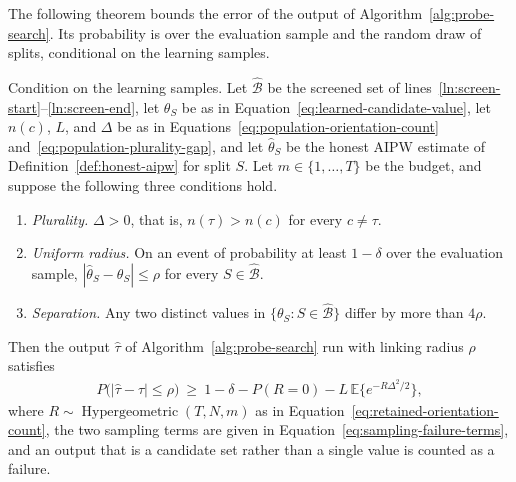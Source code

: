 The following theorem bounds the error of the output of Algorithm~\ref{alg:probe-search}. Its probability is over the evaluation sample and the random draw of splits, conditional on the learning samples.

\begin{theorem}
\label{thm:probe-search-error}
\normalfont

Condition on the learning samples. Let $\widehat{\mathcal B}$ be the screened set of lines~\ref{ln:screen-start}--\ref{ln:screen-end}, let $\theta_S$ be as in Equation~\eqref{eq:learned-candidate-value}, let $n(c)$, $L$, and $\Delta$ be as in Equations~\eqref{eq:population-orientation-count} and~\eqref{eq:population-plurality-gap}, and let $\widehat\theta_S$ be the honest AIPW estimate of Definition~\ref{def:honest-aipw} for split $S$. Let $m\in\{1,\ldots,T\}$ be the budget, and suppose the following three conditions hold.
\begin{enumerate}[label=(\alph*),leftmargin=*]
\item \textit{Plurality.} $\Delta>0$, that is, $n(\tau)>n(c)$ for every $c\ne\tau$.
\item \textit{Uniform radius.} On an event of probability at least $1-\delta$ over the evaluation sample, $|\widehat\theta_S-\theta_S|\le\rho$ for every $S\in\widehat{\mathcal B}$.
\item \textit{Separation.} Any two distinct values in $\{\theta_S:S\in\widehat{\mathcal B}\}$ differ by more than $4\rho$.
\end{enumerate}
Then the output $\widehat\tau$ of Algorithm~\ref{alg:probe-search} run with linking radius $\rho$ satisfies
\begin{align}\label{eq:probe-search-error-probability}
	P\bigl(|\widehat\tau-\tau|\le\rho\bigr)
	\ \ge\
	1-\delta-P(R=0)-L\,\mathbb E\bigl\{e^{-R\Delta^2/2}\bigr\},
\end{align}
where $R\sim\operatorname{Hypergeometric}(T,N,m)$ as in Equation~\eqref{eq:retained-orientation-count}, the two sampling terms are given in Equation~\eqref{eq:sampling-failure-terms}, and an output that is a candidate set rather than a single value is counted as a failure.

\end{theorem}

